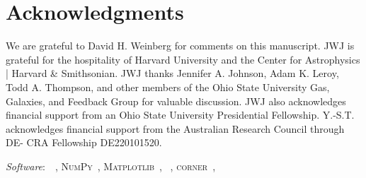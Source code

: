 \documentclass[ms.tex]{subfiles}
\begin{document}
\section{Acknowledgments}
\label{sec:acknowledgments}

We are grateful to David H. Weinberg for comments on this manuscript.
JWJ is grateful for the hospitality of Harvard University and the 
Center for Astrophysics | Harvard \& Smithsonian.
JWJ thanks Jennifer A. Johnson, Adam K. Leroy, Todd A. Thompson, and other
members of the Ohio State University Gas, Galaxies, and Feedback Group for
valuable discussion.
JWJ also acknowledges financial support from an Ohio State University
Presidential Fellowship.
Y.-S.T. acknowledges financial support from the Australian Research Council
through DE- CRA Fellowship DE220101520.
\par\null\par\noindent
\textit{Software}:~\vice~\citep{Johnson2020},
\textsc{NumPy}~\citep{Harris2020},
\textsc{Matplotlib}~\citep{Hunter2007},
\mc~\citep{ForemanMackey2013},
\textsc{corner}~\citep{ForemanMackey2016},
\end{document}
